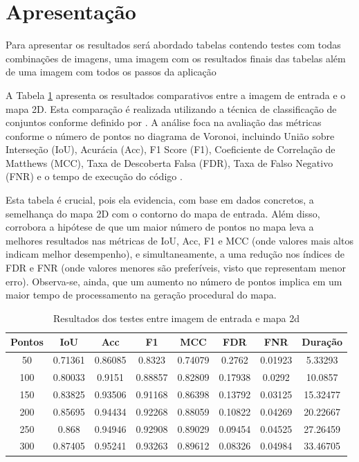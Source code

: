 \section{Apresentação}

Para apresentar os resultados será abordado tabelas contendo testes com todas combinações de imagens, uma imagem com os resultados finais das tabelas além de uma imagem com todos os passos da aplicação

A Tabela \ref{tab:final_input_output_2d} apresenta os resultados comparativos entre a imagem de entrada e o mapa 2D. Esta comparação é realizada utilizando a técnica de classificação de conjuntos conforme definido por \cite{kirillov2019panoptic}. A análise foca na avaliação das métricas conforme o número de pontos no diagrama de Voronoi, incluindo União sobre Interseção (IoU), Acurácia (Acc), F1 Score (F1), Coeficiente de Correlação de Matthews (MCC), Taxa de Descoberta Falsa (FDR), Taxa de Falso Negativo (FNR) e o tempo de execução do código \cite{Chicco2020, confusion_matrix_calculator, iou_metric_link}.

Esta tabela é crucial, pois ela evidencia, com base em dados concretos, a semelhança do mapa 2D com o contorno do mapa de entrada. Além disso, corrobora a hipótese de que um maior número de pontos no mapa leva a melhores resultados nas métricas de IoU, Acc, F1 e MCC (onde valores mais altos indicam melhor desempenho), e simultaneamente, a uma redução nos índices de FDR e FNR (onde valores menores são preferíveis, visto que representam menor erro). Observa-se, ainda, que um aumento no número de pontos implica em um maior tempo de processamento na geração procedural do mapa.


\begin{table}[h]
	\centering
	\caption{Resultados dos testes entre imagem de entrada e mapa 2d}
	\label{tab:final_input_output_2d}
	\begin{tabular}{|c|c|c|c|c|c|c|c|}
		\hline
						Pontos & IoU & Acc & F1 & MCC & FDR & FNR & Duração \\
		\hline
		50 & 0.71361 & 0.86085 & 0.8323 & 0.74079 & 0.2762 & 0.01923 & 5.33293\\
100 & 0.80033 & 0.9151 & 0.88857 & 0.82809 & 0.17938 & 0.0292 & 10.0857\\
150 & 0.83825 & 0.93506 & 0.91168 & 0.86398 & 0.13792 & 0.03125 & 15.32477\\
200 & 0.85695 & 0.94434 & 0.92268 & 0.88059 & 0.10822 & 0.04269 & 20.22667\\
250 & 0.868 & 0.94946 & 0.92908 & 0.89029 & 0.09454 & 0.04525 & 27.26459\\
300 & 0.87405 & 0.95241 & 0.93263 & 0.89612 & 0.08326 & 0.04984 & 33.46705\\
		\hline
	\end{tabular}
\end{table}


